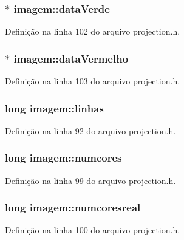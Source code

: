 \subsubsection[{data\+Verde}]{$\ast$ imagem\+::data\+Verde}\label{structimagem_a9f707388326b7c4424ec44f5b34bcffb}


Definição na linha 102 do arquivo projection.\+h.

\subsubsection[{data\+Vermelho}]{$\ast$ imagem\+::data\+Vermelho}\label{structimagem_a89bd7225940c764b1774697f677c2381}


Definição na linha 103 do arquivo projection.\+h.

\subsubsection[{linhas}]{\setlength{\rightskip}{0pt plus 5cm}long imagem\+::linhas}\label{structimagem_afecbf166e804786c1d7b502bc24989c9}


Definição na linha 92 do arquivo projection.\+h.

\subsubsection[{numcores}]{\setlength{\rightskip}{0pt plus 5cm}long imagem\+::numcores}\label{structimagem_ab19d0ae4ebaa06cfcf2aca554a99d693}


Definição na linha 99 do arquivo projection.\+h.

\subsubsection[{numcoresreal}]{\setlength{\rightskip}{0pt plus 5cm}long imagem\+::numcoresreal}\label{structimagem_a15c5c51873981f69c8281cf68be39c27}


Definição na linha 100 do arquivo projection.\+h.

